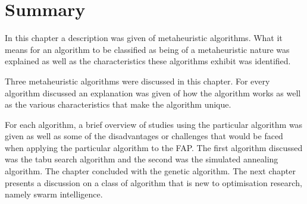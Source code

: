 \section {Summary}
In this chapter a description was given of metaheuristic algorithms. What it means for an algorithm to be classified as being of a metaheuristic nature was explained as well as the characteristics these algorithms exhibit was identified.

Three metaheuristic algorithms were discussed in this chapter. For every algorithm discussed an explanation was given of how the algorithm works as well as the various characteristics that make the algorithm unique.

For each algorithm, a brief overview of studies using the particular algorithm was given as well as some of the disadvantages or challenges that would be faced when applying the particular algorithm to the \gls{FAP}.
The first algorithm discussed was the tabu search algorithm and the second was the simulated annealing algorithm. The chapter concluded with the genetic algorithm. 
The next chapter presents a discussion on a class of algorithm that is new to optimisation research, namely swarm intelligence.

